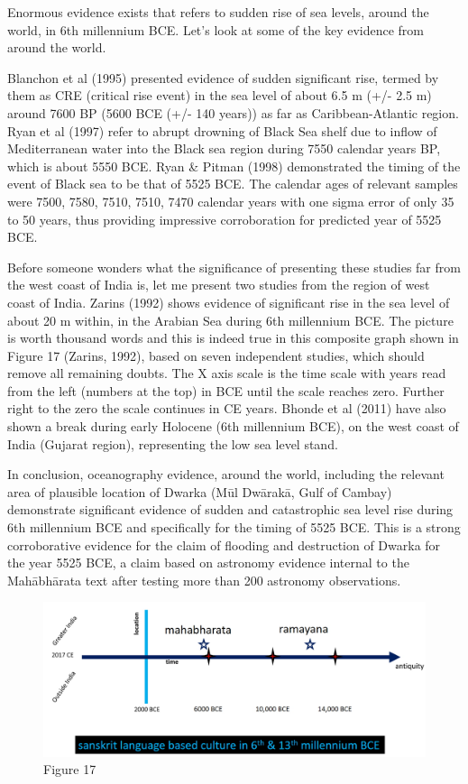 Enormous evidence exists that refers to sudden rise of sea levels, around the world, in 6th millennium BCE. Let’s look at some of the key evidence from around the world.

Blanchon et al (1995) presented evidence of sudden significant rise, termed by them as CRE (critical rise event) in the sea level of about 6.5 m (+/- 2.5 m) around 7600 BP (5600 BCE (+/- 140 years)) as far as Caribbean-Atlantic region. Ryan et al (1997) refer to abrupt drowning of Black Sea shelf due to inflow of Mediterranean water into the Black sea region during 7550 calendar years BP, which is about 5550 BCE. Ryan \& Pitman (1998) demonstrated the timing of the event of Black sea to be that of 5525 BCE. The calendar ages of relevant samples were 7500, 7580, 7510, 7510, 7470 calendar years with one sigma error of only 35 to 50 years, thus providing impressive corroboration for predicted year of 5525 BCE.

Before someone wonders what the significance of presenting these studies far from the west coast of India is, let me present two studies from the region of west coast of India. Zarins (1992) shows evidence of significant rise in the sea level of about 20 m within, in the Arabian Sea during 6th millennium BCE. The picture is worth thousand words and this is indeed true in this composite graph shown in Figure 17 (Zarins, 1992), based on seven independent studies, which should remove all remaining doubts. The X axis scale is the time scale with years read from the left (numbers at the top) in BCE until the scale reaches zero. Further right to the zero the scale continues in CE years. Bhonde et al (2011) have also shown a break during early Holocene (6th millennium BCE), on the west coast of India (Gujarat region), representing the low sea level stand.

In conclusion, oceanography evidence, around the world, including the relevant area of plausible location of Dwarka (Mūl Dwārakā, Gulf of Cambay) demonstrate significant evidence of sudden and catastrophic sea level rise during 6th millennium BCE and specifically for the timing of 5525 BCE. This is a strong corroborative evidence for the claim of flooding and destruction of Dwarka for the year 5525 BCE, a claim based on astronomy evidence internal to the Mahābhārata text after testing more than 200 astronomy observations.

\begin{figure}
\includegraphics{"images/8-17.jpg"}
\caption{Figure 17}
\end{figure}


